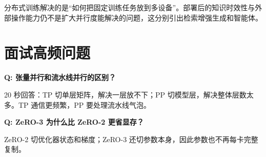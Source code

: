 分布式训练解决的是“如何把固定训练任务放到多设备”。部署后的知识时效性与外部操作能力仍不是扩大并行度能解决的问题，这分别引出检索增强生成和智能体。

\section*{面试高频问题}

\textbf{Q: 张量并行和流水线并行的区别？}

20 秒回答：TP 切单层矩阵，解决一层放不下；PP 切模型层，解决整体层数太多。TP 通信更频繁，PP 要处理流水线气泡。

\textbf{Q: ZeRO-3 为什么比 ZeRO-2 更省显存？}

ZeRO-2 切优化器状态和梯度；ZeRO-3 还切参数本身，因此参数也不再每卡完整复制。
